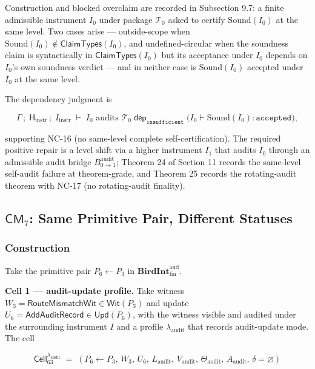 \documentclass[11pt]{article}
\theoremstyle{definition}
\begin{document}
Construction and blocked overclaim are recorded in Subsection 9.7: a finite admissible instrument \(I_0\) under package \(\mathcal T_0\) asked to certify \(\mathrm{Sound}(I_0)\) at the same level. Two cases arise --- outside-scope when \(\mathrm{Sound}(I_0)\notin\mathsf{ClaimTypes}(I_0)\), and undefined-circular when the soundness claim is syntactically in \(\mathsf{ClaimTypes}(I_0)\) but its acceptance under \(I_0\) depends on \(I_0\)'s own soundness verdict --- and in neither case is \(\mathrm{Sound}(I_0)\) accepted under \(I_0\) at the same level.

The dependency judgment is

\[
\Gamma\,;\;\mathsf H_{\mathrm{instr}}\,;\;I_{\mathrm{instr}}\;\vdash\;I_0\text{ audits }\mathcal T_0\;\mathrel{\mathsf{dep}_{\texttt{insufficient}}}\;\bigl(I_0\vdash\mathrm{Sound}(I_0):\texttt{accepted}\bigr),
\]

supporting NC-16 (no same-level complete self-certification). The required positive repair is a level shift via a higher instrument \(I_1\) that audits \(I_0\) through an admissible audit bridge \(B^{\mathrm{audit}}_{0\to 1}\); Theorem 24 of Section 11 records the same-level self-audit failure at theorem-grade, and Theorem 25 records the rotating-audit theorem with NC-17 (no rotating-audit finality).

\subsection{\texorpdfstring{\(\mathsf{CM}_7\): Same Primitive Pair, Different Statuses}{C.8 \textbackslash mathsf\{CM\}\_7: Same Primitive Pair, Different Statuses}}

\subsubsection{Construction}

Take the primitive pair \(P_6\leftarrow P_3\) in \(\mathbf{BirdInt}^{\mathrm{aud}}_{\mathrm{fin}}\).

\textbf{Cell 1 --- audit-update profile.} Take witness \(W_3=\mathsf{RouteMismatchWit}\in\mathsf{Wit}(P_3)\) and update \(U_6=\mathsf{AddAuditRecord}\in\mathsf{Upd}(P_6)\), with the witness visible and audited under the surrounding instrument \(I\) and a profile \(\lambda_{\mathrm{audit}}\) that records audit-update mode. The cell

\[
\mathsf{Cell}_{63}^{\lambda_{\mathrm{audit}}}\;=\;(P_6\leftarrow P_3,\,W_3,\,U_6,\,L_{\mathrm{audit}},\,V_{\mathrm{audit}},\,\Theta_{\mathrm{audit}},\,A_{\mathrm{audit}},\,\delta=\varnothing)
\]
\end{document}
